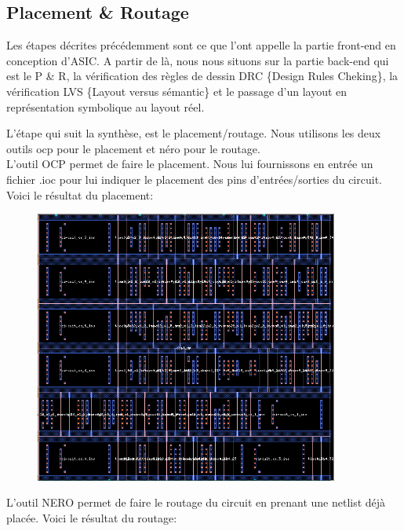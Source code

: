 \documentclass[12pt]{article}
\begin{document}
\subsection{Placement \& Routage}
Les étapes décrites précédemment sont ce que l'ont appelle la partie front-end en conception d'ASIC. A partir de là, nous nous situons sur la partie back-end qui est le P \& R, la vérification des règles de dessin DRC \{{Design Rules Cheking}\}, la vérification LVS \{{Layout versus sémantic}\} et le passage d'un layout en représentation symbolique au layout réel.

L’étape qui suit la synthèse, est le placement/routage. Nous utilisons les deux outils ocp pour le placement et néro pour le routage.\\
L'outil OCP permet de faire le placement. Nous lui fournissons en entrée un fichier .ioc pour lui indiquer le placement des pins d'entrées/sorties du circuit.\\Voici le résultat du placement:

\begin{figure}
\begin{center}
  \includegraphics[width = 10cm]{pic/place.png}
\end{center}
\end{figure}

L'outil NERO permet de faire le routage du circuit en prenant une netlist déjà placée. Voici le résultat du routage:
\end{document}
